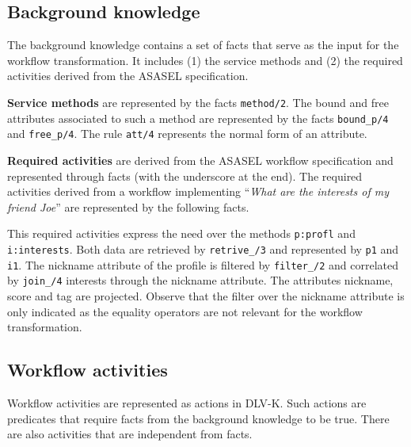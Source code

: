 \subsection{Background knowledge} \label{subsec:kb}
The background knowledge contains a set of facts that serve as the input for the workflow transformation. It includes (1) the service methods and (2) the required activities derived from the ASASEL specification.
               
\textbf{Service methods} are represented by the facts \texttt{method/2}. The bound and free attributes associated to such a method are represented by the facts \texttt{bound_p/4} and \texttt{free_p/4}. The rule \texttt{att/4} represents the normal form of an attribute.

%


            
\textbf{Required activities} are derived from the ASASEL workflow specification and represented through facts (with the underscore at the end). The required activities derived from a workflow implementing ``\textit{What are the interests of my friend Joe}'' are represented by the following facts. 

%



This required activities express the need over the methods \texttt{p:profl} and \texttt{i:interests}. Both data are retrieved by \texttt{retrive\_/3} and represented by \texttt{p1} and \texttt{i1}. The nickname attribute of the profile is filtered by \texttt{filter\_/2} and correlated by \texttt{join\_/4} interests through the nickname attribute. The attributes nickname, score and tag are projected. Observe that the filter over the nickname attribute is only indicated as the equality operators are not relevant for the workflow transformation.

\subsection{Workflow activities}
Workflow activities are represented as actions in DLV-K. Such actions are predicates that require facts from the background knowledge to be true. There are also activities that are independent from facts.
         
